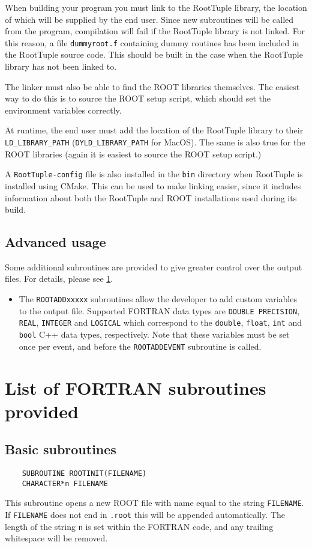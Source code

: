 \documentclass[a4paper,12pt]{article}
\begin{document}
When building your program you must link to the RootTuple library, the location of which will be supplied by the end user. Since new subroutines will be called from the program, compilation will fail if the RootTuple library is not linked. For this reason, a file \verb|dummyroot.f| containing dummy routines has been included in the RootTuple source code. This should be built in the case when the RootTuple library has not been linked to.

The linker must also be able to find the ROOT libraries themselves. The easiest way to do this is to source the ROOT setup script, which should set the environment variables correctly.

At runtime, the end user must add the location of the RootTuple library to their \verb|LD_LIBRARY_PATH| (\verb|DYLD_LIBRARY_PATH| for MacOS). The same is also true for the ROOT libraries (again it is easiest to source the ROOT setup script.)

A \verb|RootTuple-config| file is also installed in the \verb|bin| directory when RootTuple is installed using CMake. This can be used to make linking easier, since it includes information about both the RootTuple and ROOT installations used during its build.

\subsection{Advanced usage}
Some additional subroutines are provided to give greater control over the output files. For details, please see \textsection\ref{sec:routines}.
\begin{itemize}
    \item The \verb|ROOTADDxxxxx| subroutines allow the developer to add custom variables to the output file. Supported FORTRAN data types are \verb|DOUBLE PRECISION|, \verb|REAL|, \verb|INTEGER| and \verb|LOGICAL| which correspond to the \verb|double|, \verb|float|, \verb|int| and \verb|bool| C++ data types, respectively. Note that these variables must be set once per event, and before the \verb|ROOTADDEVENT| subroutine is called.
\end{itemize}

\section{List of FORTRAN subroutines provided}
\label{sec:routines}
\subsection{Basic subroutines}
\begin{verbatim}
    SUBROUTINE ROOTINIT(FILENAME)
    CHARACTER*n FILENAME\end{verbatim}
This subroutine opens a new ROOT file with name equal to the string \verb|FILENAME|. If \verb|FILENAME| does not end in \verb|.root| this will be appended automatically. The length of the string \verb|n| is set within the FORTRAN code, and any trailing whitespace will be removed.
\end{document}
